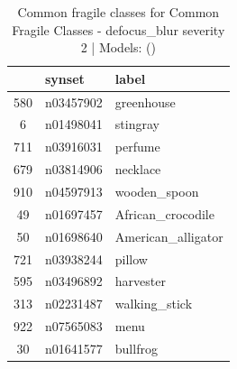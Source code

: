 \begin{table}
\caption{Common fragile classes for Common Fragile Classes - defocus_blur severity 2 | Models: ()}
\label{tab:Common Fragile Classes - defocus_blur severity 2_d41d8cd9}
\begin{tabular}{cll}
\toprule
 & synset & label \\
\midrule
580 & n03457902 & greenhouse \\
6 & n01498041 & stingray \\
711 & n03916031 & perfume \\
679 & n03814906 & necklace \\
910 & n04597913 & wooden_spoon \\
49 & n01697457 & African_crocodile \\
50 & n01698640 & American_alligator \\
721 & n03938244 & pillow \\
595 & n03496892 & harvester \\
313 & n02231487 & walking_stick \\
922 & n07565083 & menu \\
30 & n01641577 & bullfrog \\
\bottomrule
\end{tabular}
\end{table}
